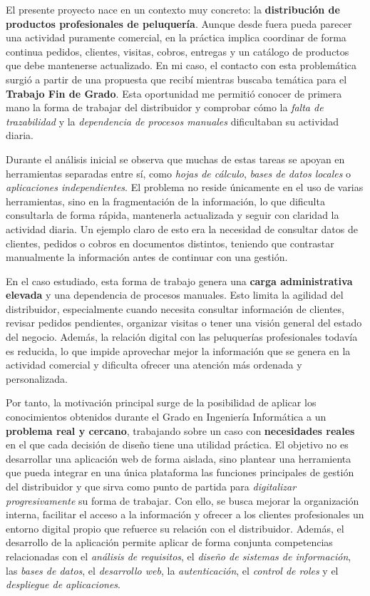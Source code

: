 El presente proyecto nace en un contexto muy concreto: la \textbf{distribución de productos profesionales de peluquería}. Aunque desde fuera pueda parecer una actividad puramente comercial, en la práctica implica coordinar de forma continua pedidos, clientes, visitas, cobros, entregas y un catálogo de productos que debe mantenerse actualizado. En mi caso, el contacto con esta problemática surgió a partir de una propuesta que recibí mientras buscaba temática para el \textbf{Trabajo Fin de Grado}. Esta oportunidad me permitió conocer de primera mano la forma de trabajar del distribuidor y comprobar cómo la \textit{falta de trazabilidad} y la \textit{dependencia de procesos manuales} dificultaban su actividad diaria.

Durante el análisis inicial se observa que muchas de estas tareas se apoyan en herramientas separadas entre sí, como \textit{hojas de cálculo}, \textit{bases de datos locales} o \textit{aplicaciones independientes}. El problema no reside únicamente en el uso de varias herramientas, sino en la fragmentación de la información, lo que dificulta consultarla de forma rápida, mantenerla actualizada y seguir con claridad la actividad diaria. Un ejemplo claro de esto era la necesidad de consultar datos de clientes, pedidos o cobros en documentos distintos, teniendo que contrastar manualmente la información antes de continuar con una gestión.

En el caso estudiado, esta forma de trabajo genera una \textbf{carga administrativa elevada} y una dependencia de procesos manuales. Esto limita la agilidad del distribuidor, especialmente cuando necesita consultar información de clientes, revisar pedidos pendientes, organizar visitas o tener una visión general del estado del negocio. Además, la relación digital con las peluquerías profesionales todavía es reducida, lo que impide aprovechar mejor la información que se genera en la actividad comercial y dificulta ofrecer una atención más ordenada y personalizada.

Por tanto, la motivación principal surge de la posibilidad de aplicar los conocimientos obtenidos durante el Grado en Ingeniería Informática a un \textbf{problema real y cercano}, trabajando sobre un caso con \textbf{necesidades reales} en el que cada decisión de diseño tiene una utilidad práctica. El objetivo no es desarrollar una aplicación web de forma aislada, sino plantear una herramienta que pueda integrar en una única plataforma las funciones principales de gestión del distribuidor y que sirva como punto de partida para \textit{digitalizar progresivamente} su forma de trabajar. Con ello, se busca mejorar la organización interna, facilitar el acceso a la información y ofrecer a los clientes profesionales un entorno digital propio que refuerce su relación con el distribuidor. Además, el desarrollo de la aplicación permite aplicar de forma conjunta competencias relacionadas con el \textit{análisis de requisitos}, el \textit{diseño de sistemas de información}, las \textit{bases de datos}, el \textit{desarrollo web}, la \textit{autenticación}, el \textit{control de roles} y el \textit{despliegue de aplicaciones}.